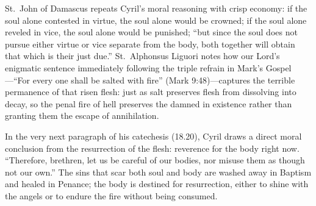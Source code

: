 St.\ John of Damascus repeats Cyril's moral reasoning with crisp economy: if the soul alone contested in virtue, the soul alone would be crowned; if the soul alone reveled in vice, the soul alone would be punished; ``but since the soul does not pursue either virtue or vice separate from the body, both together will obtain that which is their just due.'' St.\ Alphonsus Liguori notes how our Lord's enigmatic sentence immediately following the triple refrain in Mark's Gospel---``For every one shall be salted with fire'' (Mark 9:48)---captures the terrible permanence of that risen flesh: just as salt preserves flesh from dissolving into decay, so the penal fire of hell preserves the damned in existence rather than granting them the escape of annihilation.

In the very next paragraph of his catechesis (18.20), Cyril draws a direct moral conclusion from the resurrection of the flesh: reverence for the body right now. ``Therefore, brethren, let us be careful of our bodies, nor misuse them as though not our own.'' The sins that scar both soul and body are washed away in Baptism and healed in Penance; the body is destined for resurrection, either to shine with the angels or to endure the fire without being consumed.
